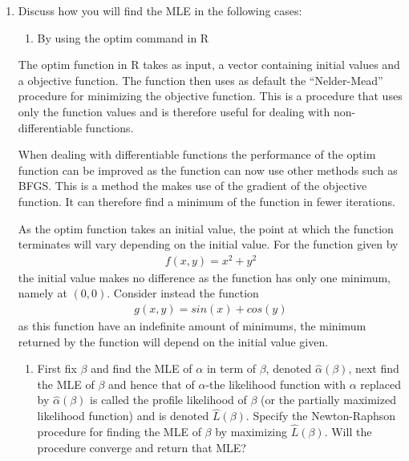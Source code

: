 \begin{enumerate}[resume]
    \item Discuss how you will find the MLE in the following cases: 
    \begin{enumerate}[label = (\alph*)]
        \item By using the optim command in R
    \end{enumerate}
The optim function in R takes as input, a vector containing initial values and a objective function.
The function then uses as default the ``Nelder-Mead'' procedure for minimizing the objective function. This is a procedure that uses only the function values and is therefore useful for dealing with non-differentiable functions.

When dealing with differentiable functions the performance of the optim function can be improved as the function can now use other methods such as BFGS. 
This is a method the makes use of the gradient of the objective function.
It can therefore find a minimum of the function in fewer iterations.

As the optim function takes an initial value, the point at which the function terminates will vary depending on the initial value.
For the function given by
\begin{align*}
    f(x,y) = x^2 + y^2
\end{align*}
the initial value makes no difference as the function has only one minimum, namely at $(0,0)$.
Consider instead the function
\begin{align*}
    g(x,y) = sin(x) + cos(y)
\end{align*}
as this function have an indefinite amount of minimums, the minimum returned by the function will depend on the initial value given.
    \begin{enumerate}[label = (\alph*), resume]
        \item First fix $\beta$ and find the MLE of $\alpha$ in term of $\beta$, denoted $\hat{\alpha}(\beta)$, next find the MLE of $\beta$ and hence that of $\alpha$-the likelihood function with $\alpha$ replaced by $\hat{\alpha}(\beta)$ is called the profile likelihood of $\beta$ (or the partially maximized likelihood function) and is denoted $\hat{L}(\beta)$. Specify the Newton-Raphson procedure for finding the MLE of $\beta$ by maximizing $\hat{L}(\beta)$. Will the procedure converge and return that MLE?
    \end{enumerate}
\end{enumerate}


